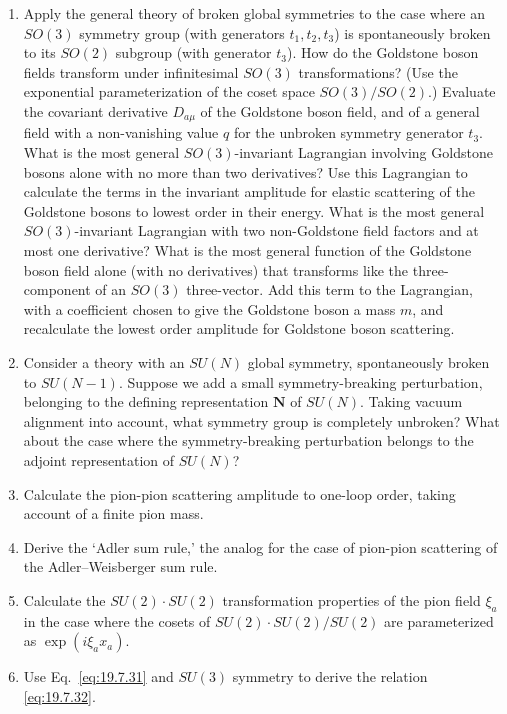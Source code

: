 

\begin{enumerate}
\item Apply the general theory of broken global symmetries to the case where an $SO(3)$ symmetry group (with generators $t_1,t_2,t_3$) is spontaneously broken to its $SO(2)$ subgroup (with generator $t_3$). How do the Goldstone boson fields transform under infinitesimal $SO(3)$ transformations? (Use the exponential parameterization of the coset space $SO(3)/SO(2)$.) Evaluate the covariant derivative $D_{a\mu}$ of the Goldstone boson field, and of a general field with a non-vanishing value $q$ for the unbroken symmetry generator $t_3$. What is the most general $SO(3)$-invariant Lagrangian involving Goldstone bosons alone with no more than two derivatives? Use this Lagrangian to calculate the terms in the invariant amplitude for elastic scattering of the Goldstone bosons to lowest order in their energy. What is the most general $SO(3)$-invariant Lagrangian with two non-Goldstone field factors and at most one derivative? What is the most general function of the Goldstone boson field alone (with no derivatives) that transforms like the three-component of an $SO(3)$ three-vector. Add this term to the Lagrangian, with a coefficient chosen to give the Goldstone boson a mass $m$, and recalculate the lowest order amplitude for Goldstone boson scattering.

\item Consider a theory with an $SU(N)$ global symmetry, spontaneously broken to $SU(N-1)$. Suppose we add a small symmetry-breaking perturbation, belonging to the defining representation $\mathbf N$ of $SU(N)$. Taking vacuum alignment into account, what symmetry group is completely unbroken? What about the case where the symmetry-breaking perturbation belongs to the adjoint representation of $SU(N)$?

\item Calculate the pion-pion scattering amplitude to one-loop order, taking account of a finite pion mass.

\item Derive the `Adler sum rule,' the analog for the case of pion-pion scattering of the Adler--Weisberger sum rule.

\item Calculate the $SU(2)\cdot SU(2)$ transformation properties of the pion field $\xi_a$ in the case where the cosets of $SU(2)\cdot SU(2)/SU(2)$ are parameterized as $\exp(i\xi_ax_a)$.

\item Use Eq.~\eqref{eq:19.7.31} and $SU(3)$ symmetry to derive the relation \eqref{eq:19.7.32}.
\end{enumerate}

